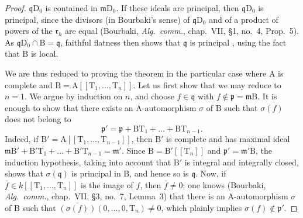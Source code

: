 \begin{proof}
$\mathfrak{q}\mathrm{D}_0$ is contained in $\mathfrak{m}\mathrm{D}_0$. If these ideals are principal, then $\mathfrak{q}\mathrm{D}_0$ is principal, since the divisors (in Bourbaki's sense) of $\mathfrak{q}\mathrm{D}_0$ and of a product of powers of the $\mathfrak{r}_h$ are equal (Bourbaki, \emph{Alg.\ comm.}, chap.~VII, \S1, no.~4, Prop.~5). As $\mathfrak{q}\mathrm{D}_0\cap\mathrm{B}=\mathfrak{q}$, faithful flatness then shows that $\mathfrak{q}$ is principal , using the fact that $\mathrm{B}$ is local.

We are thus reduced to proving the theorem in the particular case where $\mathrm{A}$ is complete and $\mathrm{B}=\mathrm{A}[[\mathrm{T}_1,\ldots,\mathrm{T}_n]]$. Let us first show that we may reduce to $n=1$. We argue by induction on $n$, and choose $f\in\mathfrak{q}$ with $f\notin\mathfrak{p}=\mathfrak{m}\mathrm{B}$. It is enough to show that there exists an $\mathrm{A}$-automorphism $\sigma$ of $\mathrm{B}$ such that $\sigma(f)$ does not belong to
\[
  \mathfrak{p}'=\mathfrak{p}+\mathrm{B}\mathrm{T}_1+\ldots+\mathrm{B}\mathrm{T}_{n-1}.
\]
Indeed, if $\mathrm{B}'=\mathrm{A}[[\mathrm{T}_1,\ldots,\mathrm{T}_{n-1}]]$, then $\mathrm{B}'$ is complete and has maximal ideal $\mathfrak{m}\mathrm{B}'+\mathrm{B}'\mathrm{T}_1+\ldots+\mathrm{B}'\mathrm{T}_{n-1}=\mathfrak{m}'$. Since $\mathrm{B}=\mathrm{B}'[[\mathrm{T}_n]]$ and $\mathfrak{p}'=\mathfrak{m}'\mathrm{B}$, the induction hypothesis, taking into account that $\mathrm{B}'$ is integral and integrally closed, shows that $\sigma(\mathfrak{q})$ is principal in $\mathrm{B}$, and hence so is $\mathfrak{q}$. Now, if $\overline{f}\in k[[\mathrm{T}_1,\ldots,\mathrm{T}_n]]$ is the image of $f$, then $\overline{f}\neq0$; one knows (Bourbaki, \emph{Alg.\ comm.}, chap.~VII, \S3, no.~7, Lemma~3) that there is an $\mathrm{A}$-automorphism $\sigma$ of $\mathrm{B}$ such that $\overline{(\sigma(f))}(0,\ldots,0,\mathrm{T}_n)\neq0$, which plainly implies $\sigma(f)\notin\mathfrak{p}'$.


\end{proof}
